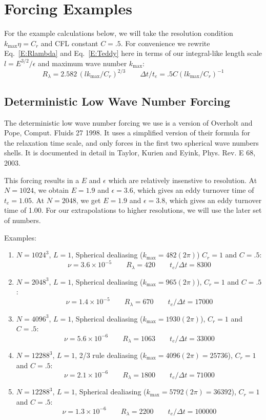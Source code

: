 \documentclass[12pt]{article}
\begin{document}
\section{Forcing Examples}

For the example calculations below, we will take the resolution condition
$ k_\text{max} \eta = C_r $ and CFL constant $C=.5$.  
For convenience we rewrite Eq.~\ref{E:Rlambda} and Eq.~\ref{E:Teddy} here 
in terms of our integral-like length scale $l=E^{3/2}/ \epsilon$ and
maximum wave number $k_\text{max}$:
\[
R_\lambda =   2.582 \,  (l k_\text{max}/C_r)^{2/3}
\qquad
\Delta t / t_e  =   .5 C   (l k_\text{max}/C_r)^{-1} 
\]


\subsection{Deterministic Low Wave Number Forcing}

The deterministic low wave number forcing we use is a version
of Overholt and Pope, Comput. Fluids 27 1998.  It uses a simplified
version of their formula for the relaxation time scale, and only forces
in the first two spherical wave numbers shells.
It is documented in detail in Taylor, Kurien and Eyink, Phys. Rev. E 68, 2003. 

This forcing results in a $E$ and $\epsilon$ which are relatively
insenstive to resolution.  At $N=1024$, we obtain 
$E=1.9$ and $\epsilon=3.6$, which gives
an eddy turnover time of $t_e = 1.05$.
At $N=2048$, we get $E=1.9$ and $\epsilon=3.8$, which gives
an eddy turnover time of 1.00.  For our extrapolations to higher resolutions, 
we will use the later set of numbers.  


Examples:
\begin{enumerate}
\item $N=1024^3$, $L=1$, Spherical dealiasing ($k_\text{max} = 482(2\pi)$)
$C_r=1$ and $C=.5$:
\[
\nu = 3.6 \times 10^{-5} \qquad  R_\lambda =  420\qquad t_e / \Delta t = 8300
\]

\item $N=2048^3$, $L=1$, Spherical dealiasing ($k_\text{max} = 965(2\pi)$),
$C_r=1$ and $C=.5$:
\[
\nu = 1.4 \times 10^{-5} \qquad  R_\lambda =  670\qquad t_e / \Delta t = 17000
\]

\item $N=4096^3$, $L=1$, Spherical dealiasing ($k_\text{max} = 1930(2\pi)$),
$C_r=1$ and $C=.5$:
\[
\nu = 5.6 \times 10^{-6} \qquad  R_\lambda =  1063\qquad t_e / \Delta t = 33000
\]

\item $N=12288^3$, $L=1$, 2/3 rule dealiasing ($k_\text{max} = 4096(2\pi) = 25736$), 
$C_r=1$ and $C=.5$:
\[
\nu = 2.1 \times 10^{-6} \qquad  R_\lambda =  1800\qquad t_e/\Delta t = 71000
\]

\item $N=12288^3$, $L=1$, Spherical dealiasing ($k_\text{max} = 5792(2\pi) = 36392$), 
$C_r=1$ and $C=.5$:
\[
\nu = 1.3 \times 10^{-6} \qquad  R_\lambda =  2200 \qquad t_e / \Delta t  = 100000
\]



\end{enumerate}
\end{document}
